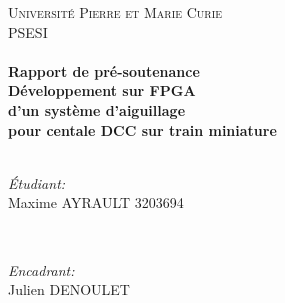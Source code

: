 \begin{titlepage}

\center %
 

\textsc{\LARGE Universit\'e Pierre et Marie Curie}\\[1.5cm] %
\textsc{\Large PSESI}\\[0.5cm] %


\HRule \\[0.4cm]
{ \huge \bfseries Rapport de pr\'e-soutenance}\\[0.4cm] %
{ \huge \bfseries D\'eveloppement sur FPGA \\d'un système d'aiguillage
  \\pour centale DCC sur train miniature}\\[0.4cm] %
\HRule \\[1.5cm]
 

\begin{minipage}{0.4\textwidth}
\begin{flushleft} \large
\emph{\'Etudiant:}\\
Maxime \textsc{AYRAULT} 3203694 %
\end{flushleft}
\end{minipage}
~
\begin{minipage}{0.4\textwidth}
\begin{flushright} \large
\emph{Encadrant:} \\
Julien \textsc{DENOULET} %
\end{flushright}
\end{minipage}\\[2cm]



\end{titlepage}

